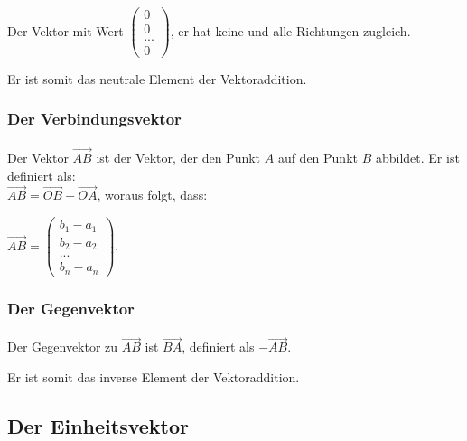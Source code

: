 \paragraph{} Der Vektor mit Wert $\left(\begin{array}{c} 0 \\ 0 \\ ...\\0\end{array}\right)$, er hat keine und alle Richtungen zugleich.
\begin{Bemerkung}
Er ist somit das neutrale Element der Vektoraddition.
\end{Bemerkung}

\subsubsection{Der Verbindungsvektor}

\paragraph{} Der Vektor $\vec{AB}$ ist der Vektor, der den Punkt $A$ auf den Punkt $B$ abbildet. Er ist definiert als:\\ $\vec{AB}=\vec{OB}-\vec{OA}$, woraus folgt, dass: \begin{center} $\vec{AB} = \left(\begin{array}{c} b_1 - a_1 \\ b_2 - a_2 \\ ... \\ b_n - a_n \end{array}\right)$. \end{center}

\subsubsection{Der Gegenvektor}

\paragraph{} Der Gegenvektor zu $\vec{AB}$ ist $\vec{BA}$, definiert als  $-\vec{AB}$.
\begin{Bemerkung}
Er ist somit das inverse Element der Vektoraddition.
\end{Bemerkung}

\subsection{Der Einheitsvektor}

